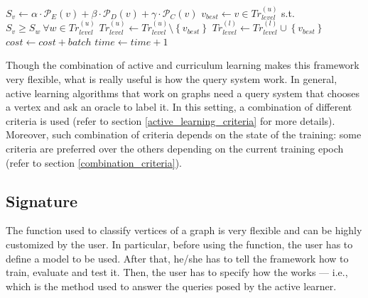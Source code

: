 \begin{algorithm}
\begin{algorithmic}[1]
                                        \State $S_v \gets \alpha \cdot \mathcal{P}_E(v) + \beta \cdot \mathcal{P}_D(v) + \gamma \cdot \mathcal{P}_C(v)$
                                    \EndFor
                                        \State $v_{best} \gets v \in Tr_{level}^{(u)}$ s.t. $S_v \ge S_w\  \forall w \in Tr_{level}^{(u)}$
                                        \State {} 
                                        \State $Tr_{level}^{(u)} \gets Tr_{level}^{(u)} \setminus \left\{v_{best}\right\}$
                                        \State $Tr_{level}^{(l)} \gets Tr_{level}^{(l)} \cup \left\{v_{best}\right\}$
                                    \EndFor
                                    \State $cost \gets cost + batch$
                                \EndIf
                                \State $time \gets time + 1$
                            \EndFor
                        \EndFor
                        \State {} 
                    \EndFunction
                \end{algorithmic}
            \end{algorithm}
            
            Though the combination of active and curriculum learning makes this framework very flexible, what is really useful is how the query system work. In general, active learning algorithms that work on graphs need a query system that chooses a vertex and ask an oracle to label it. In this setting, a combination of different criteria is used (refer to section \ref{active_learning_criteria} for more details). Moreover, such combination of criteria depends on the state of the training: some criteria are preferred over the others depending on the current training epoch (refer to section \ref{combination_criteria}).
        \subsection{Signature}\label{signature}
            The function used to classify vertices of a graph is very flexible and can be highly customized by the user. In particular, before using the function, the user has to define a model to be used. After that, he/she has to tell the framework how to train, evaluate and test it. Then, the user has to specify how the  works --- i.e., which is the method used to answer the queries posed by the active learner.
            
